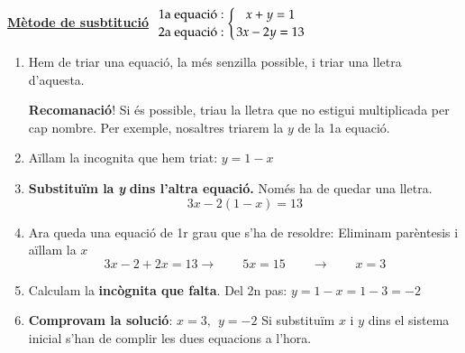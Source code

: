 \begin{example}[*]

	\textbf{\large \underline{Mètode de susbtitució}}  \quad\quad\quad\quad
	$\genfrac{}{}{0pt}{0}{\text{  1a  equaci\'o}:}{\text{  2a  equaci\'o}:} \left\{\genfrac{}{}{0pt}{0}{x+y=1}{3x-2y=13}\right.$


 \begin{enumerate}
 \item Hem de triar una equaci\'o, la m\'es senzilla possible, i triar una lletra d'aquesta. 
 
 \textbf{Recomanaci\'o}! Si \'es possible, triau la lletra que no estigui multiplicada  per cap nombre.
 Per exemple, nosaltres triarem la $y$ de la 1a equaci\'o.


\item  A\"illam la incognita que hem triat:   $y=1-x$


\item 	 \textbf{ Substitu\"im la }\textbf{\textit{y}}\textbf{ dins l'altra equaci\'o. }Nom\'es ha de quedar una lletra.
\[3x-2(1-x)=13\]
\item Ara queda una equaci\'o de 1r grau que s'ha de resoldre: Eliminam par\`entesis i a\"illam la $x$
\[3x-2+2x=13   \rightarrow \quad \quad 	5x=15  \quad \quad \rightarrow \quad \quad x=3  \]
 
\item  Calculam la \textbf{inc\`ognita que falta}. Del 2n pas:  $y=1-x=1-3=-2$ 
 
\item \textbf{Comprovam la soluci\'o}: $\boxed{x=3, \ \ y=-2}$ Si substitu\"im $x$ i $y$ dins el sistema inicial s'han de complir les dues equacions a l'hora.

\end{enumerate}	
\end{example}
\vspace{-0.5cm}

